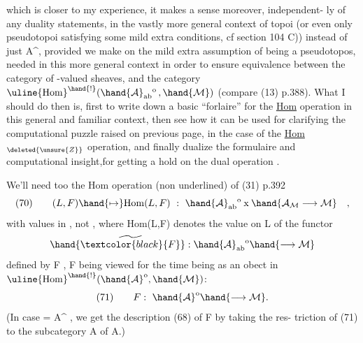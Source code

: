 
which is closer to my experience, it makes a sense moreover, independent-%
ly of any duality statements, in the vastly more general context of
topoi  (or even only pseudotopoi satisfying some mild
extra conditions, cf section 104 C)) instead of just A\^{}, provided we
\margin{$\times$}make on  the mild extra assumption of being a pseudotopos, needed in
this more general context in order to ensure equivalence between the
category  of -valued sheaves, and the category  $\uline{\mathrm{Hom}}^{\hand{!}}(\hand{\mathcal{A}}_{\mathrm{ab}}{}^{\mathrm{o}}\,,\hand{\mathcal{M}})$
(compare (13) p.388). What I should do then is, first to write down
a basic ``forlaire'' for the \uline{Hom} operation in this general and familiar
context, then see how it can be used for clarifying the computational
puzzle raised on previous page, in the case of the \uline{Hom}$_{\deleted{\unsure{Z}}}$ operation, and
finally dualize the formulaire and computational insight,for getting a
hold on the dual operation \hand{$\mathbin{\tikz[baseline=-.5ex]{\node[circle,draw,inner sep=.04em] {\ensuremath{\textcolor{black}{*}}};}}$} .

We'll need too the Hom operation (non underlined) of (31) p.392
\[
(70)\qquad (L,F)\hand{\mapsto}\mathrm{Hom}(L,F) \ : \ \hand{\mathcal{A}}_{\mathrm{ab}}{}^{\mathrm{o}}\mathbin{\mathrm{x}}\hand{\mathcal{A}_{\mathcal{M}}\longrightarrow\mathcal{M}} \quad ,
\]
with values in , not , where Hom(L,F) denotes the value on L
of the functor
\[
\hand{\widetilde{\textcolor{black}{F}}} : \hand{\mathcal{A}}_{\mathrm{ab}}{}^{\mathrm{o}}\hand{\longrightarrow\mathcal{M}}
\]
defined by F , F being viewed for the time being as an obect in
$\uline{\mathrm{Hom}}^{\hand{!}}(\hand{\mathcal{A}}^{\mathrm{o}},\hand{\mathcal{M}})$:
\[
(71)\qquad F:\ \hand{\mathcal{A}}^{\mathrm{o}}\hand{\longrightarrow\mathcal{M}}.
\]
(In case  = A\^{} , we get the description (68) of F by taking the res-%
triction of (71) to the subcategory A of A.)

